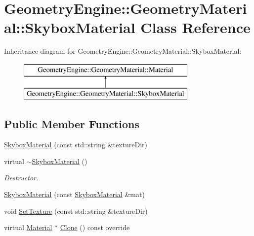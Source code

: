 \hypertarget{class_geometry_engine_1_1_geometry_material_1_1_skybox_material}{}\section{Geometry\+Engine\+::Geometry\+Material\+::Skybox\+Material Class Reference}
\label{class_geometry_engine_1_1_geometry_material_1_1_skybox_material}
Inheritance diagram for Geometry\+Engine\+::Geometry\+Material\+::Skybox\+Material\+:\begin{figure}[H]
\begin{center}
\leavevmode
\includegraphics[height=2.000000cm]{class_geometry_engine_1_1_geometry_material_1_1_skybox_material}
\end{center}
\end{figure}
\subsection*{Public Member Functions}
\begin{DoxyCompactItemize}
\item 
\mbox{\hyperlink{class_geometry_engine_1_1_geometry_material_1_1_skybox_material_a7cc6c7bb2246caad7f2eead65acb7bd8}{Skybox\+Material}} (const std\+::string \&texture\+Dir)
\item 
\mbox{\label{class_geometry_engine_1_1_geometry_material_1_1_skybox_material_a6e96ce8e7ff9235b841185481e9646fe}} 
virtual \mbox{\hyperlink{class_geometry_engine_1_1_geometry_material_1_1_skybox_material_a6e96ce8e7ff9235b841185481e9646fe}{$\sim$\+Skybox\+Material}} ()
\begin{DoxyCompactList}\small\item\em Destructor. \end{DoxyCompactList}\item 
\mbox{\hyperlink{class_geometry_engine_1_1_geometry_material_1_1_skybox_material_a36e098e2d744596441ed450effcf8160}{Skybox\+Material}} (const \mbox{\hyperlink{class_geometry_engine_1_1_geometry_material_1_1_skybox_material}{Skybox\+Material}} \&mat)
\item 
void \mbox{\hyperlink{class_geometry_engine_1_1_geometry_material_1_1_skybox_material_a8abf2f8ba43b6c17e31b3c82a958744f}{Set\+Texture}} (const std\+::string \&texture\+Dir)
\item 
virtual \mbox{\hyperlink{class_geometry_engine_1_1_geometry_material_1_1_material}{Material}} $\ast$ \mbox{\hyperlink{class_geometry_engine_1_1_geometry_material_1_1_skybox_material_ad1ec431a67d52440abfa24d66dbc12ca}{Clone}} () const override
\end{DoxyCompactItemize}

